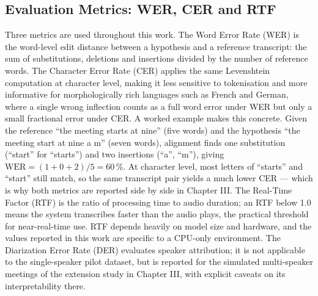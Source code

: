 \documentclass[12pt]{report}
\begin{document}
\subsection{Evaluation Metrics: WER, CER and RTF}
Three metrics are used throughout this work. The Word Error Rate (WER) is the word-level edit distance between a hypothesis and a reference transcript: the sum of substitutions, deletions and insertions divided by the number of reference words. The Character Error Rate (CER) applies the same Levenshtein computation at character level, making it less sensitive to tokenisation and more informative for morphologically rich languages such as French and German, where a single wrong inflection counts as a full word error under WER but only a small fractional error under CER.
A worked example makes this concrete. Given the reference \enquote{the meeting starts at nine} (five words) and the hypothesis \enquote{the meeting start at nine a m} (seven words), alignment finds one substitution (\enquote{start} for \enquote{starts}) and two insertions (\enquote{a}, \enquote{m}), giving $\mathrm{WER} = (1+0+2)/5 = 60\,\%$. At character level, most letters of \enquote{starts} and \enquote{start} still match, so the same transcript pair yields a much lower CER --- which is why both metrics are reported side by side in Chapter III.
The Real-Time Factor (RTF) is the ratio of processing time to audio duration; an RTF below 1.0 means the system transcribes faster than the audio plays, the practical threshold for near-real-time use. RTF depends heavily on model size and hardware, and the values reported in this work are specific to a CPU-only environment. The Diarization Error Rate (DER) evaluates speaker attribution; it is not applicable to the single-speaker pilot dataset, but is reported for the simulated multi-speaker meetings of the extension study in Chapter III, with explicit caveats on its interpretability there.
\end{document}
